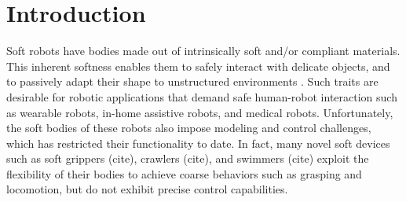 \section{Introduction} 
\label{sec:intro}

Soft robots have bodies made out of intrinsically soft and/or compliant materials.
This inherent softness enables them to safely interact with delicate objects, and to passively adapt their shape to unstructured environments \cite{rus2015design}.
Such traits are desirable for robotic applications that demand safe human-robot interaction such as wearable robots, in-home assistive robots, and medical robots.
Unfortunately, the soft bodies of these robots also impose modeling and control challenges, which has restricted their functionality to date. 
In fact, many novel soft devices such as soft grippers (cite), crawlers (cite), and swimmers (cite) exploit the flexibility of their bodies to achieve coarse behaviors such as grasping and locomotion, but do not exhibit precise control capabilities.





